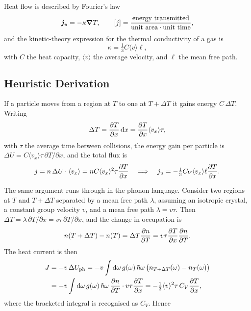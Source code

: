 Heat flow is described by Fourier's law
\begin{equation}
    \bm{j}_u = -\kappa \grad T, \qquad [j] = \frac{\text{energy transmitted}}{\text{unit area}\cdot\text{unit time}},
\end{equation}
and the kinetic-theory expression for the thermal conductivity of a gas is
\begin{equation}
    \kappa = \tfrac{1}{3} C \langle v\rangle \ell,
\end{equation}
with $C$ the heat capacity, $\langle v\rangle$ the average velocity, and $\ell$ the mean free path.

\subsection{Heuristic Derivation}

If a particle moves from a region at $T$ to one at $T + \Delta T$ it gains energy $C\,\Delta T$. Writing
\begin{equation}
    \Delta T = \pdv{T}{x}\,\dd x = \pdv{T}{x}\langle v_x\rangle \tau,
\end{equation}
with $\tau$ the average time between collisions, the energy gain per particle is $\Delta U = C\langle v_x\rangle \tau\, \partial T/\partial x$, and the total flux is
\begin{equation}
    j = n\,\Delta U \cdot \langle v_x \rangle = n C \langle v_x\rangle^2 \tau \pdv{T}{x}
    \quad\Longrightarrow\quad
    j_u = -\tfrac{1}{3}C_V \langle v_x\rangle \ell \pdv{T}{x}.
\end{equation}

The same argument runs through in the phonon language. Consider two regions at $T$ and $T + \Delta T$ separated by a mean free path $\lambda$, assuming an isotropic crystal, a constant group velocity $v$, and a mean free path $\lambda = v\tau$. Then $\Delta T = \lambda\,\partial T/\partial x = v\tau\,\partial T/\partial x$, and the change in occupation is
\begin{equation}
    n(T + \Delta T) - n(T) = \Delta T \pdv{n}{T} = v\tau \pdv{T}{x}\pdv{n}{T}.
\end{equation}
The heat current is then
\begin{align}
    J &= -v\,\Delta U_{\text{ph}} = -v\int \dd\omega\, g(\omega)\,\hbar\omega\,\bigl(n_{T + \Delta T}(\omega) - n_T(\omega)\bigr) \\
      &= -v\int \dd\omega\, g(\omega)\,\hbar\omega\,\pdv{n}{T}\cdot v\tau \pdv{T}{x}
       = -\tfrac{1}{3}\langle v\rangle^2 \tau\, C_V \pdv{T}{x},
\end{align}
where the bracketed integral is recognised as $C_V$. Hence

